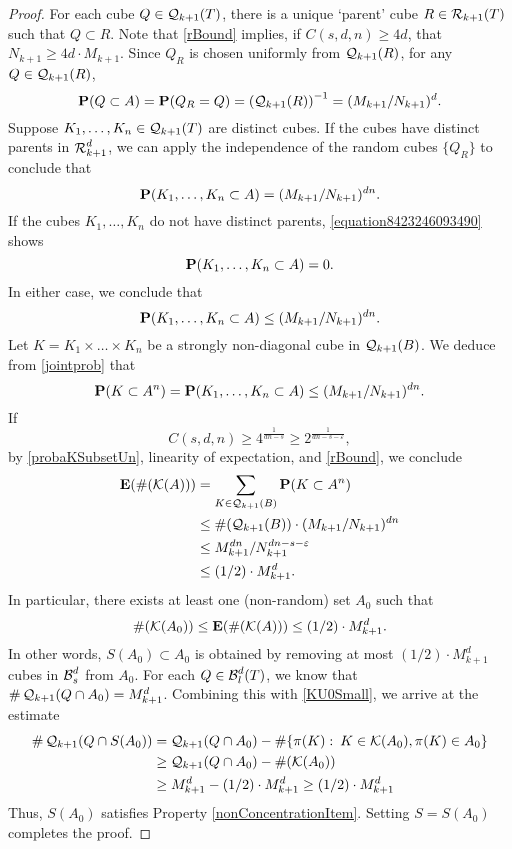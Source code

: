 \begin{proof}
	For each cube $Q \in \operatorname{\mathcal{Q}}_{k+1}(T)$, there is a unique `parent' cube $R \in \operatorname{\mathcal{R}}_{k+1}(T)$ such that $Q \subset R$. Note that \eqref{rBound} implies, if $C(s,d,n) \geq 4d$, that $N_{k+1} \geq 4d \cdot M_{k+1}$. Since $Q_R$ is chosen uniformly from $\operatorname{\mathcal{Q}}_{k+1}(R)$, for any $Q \in \operatorname{\mathcal{Q}}_{k+1}(R)$,
	\[ \operatorname{\operatorname{\mathbf{P}}}(Q \subset A) = \operatorname{\operatorname{\mathbf{P}}}(Q_R = Q) = \left( \operatorname{\mathcal{Q}}_{k+1}(R) \right)^{-1} = (M_{k+1}/N_{k+1})^d. \]
	Suppose $K_1, \dots, K_n \in \operatorname{\mathcal{Q}}_{k+1}(T)$ are distinct cubes. If the cubes have distinct parents in $\operatorname{\mathcal{R}}_{k+1}^d$, we can apply the independence of the random cubes $\{ Q_R \}$ to conclude that
	\[ \operatorname{\operatorname{\mathbf{P}}}(K_1, \dots, K_n \subset A) = (M_{k+1}/N_{k+1})^{dn}. \]
	If the cubes $K_1, \dots, K_n$ do not have distinct parents, \eqref{equation8423246093490} shows
	\[ \operatorname{\operatorname{\mathbf{P}}}(K_1, \dots, K_n \subset A) = 0. \]
	In either case, we conclude that
	\begin{equation}\label{jointprob}
	\operatorname{\operatorname{\mathbf{P}}}(K_1, \dots, K_n \subset A) \leq (M_{k+1}/N_{k+1})^{dn}.
	\end{equation}
	Let $K = K_1 \times \dots \times K_n$ be a strongly non-diagonal cube in $\operatorname{\mathcal{Q}}_{k+1}(B)$. We deduce from \eqref{jointprob} that
	\begin{equation}\label{probaKSubsetUn}
		\operatorname{\operatorname{\mathbf{P}}}(K \subset A^n) = \operatorname{\operatorname{\mathbf{P}}}(K_1, \dots, K_n \subset A) \leq (M_{k+1}/N_{k+1})^{dn}.
	\end{equation}
	If
	\[ C(s,d,n) \geq 4^{\frac{1}{dn - s}} \geq 2^{\frac{1}{dn - s - \varepsilon}}, \]
	by \eqref{probaKSubsetUn}, linearity of expectation, and \eqref{rBound}, we conclude
	\begin{align*}
		\operatorname{\operatorname{\mathbf{E}}}(\#(\mathcal{K}(A))) &= \sum_{K \in \operatorname{\mathcal{Q}}_{k+1}(B)} \operatorname{\operatorname{\mathbf{P}}}(K \subset A^n)\\
		&\leq \#(\operatorname{\mathcal{Q}}_{k+1}(B)) \cdot (M_{k+1}/N_{k+1})^{dn}\\
		&\leq M_{k+1}^{dn} / N_{k+1}^{dn - s - \varepsilon}\\
		&\leq (1/2) \cdot M_{k+1}^d.
	\end{align*}
	In particular, there exists at least one (non-random) set $A_0$ such that
	\begin{equation}\label{KU0Small}
		\#(\mathcal{K}(A_0)) \leq \operatorname{\operatorname{\mathbf{E}}}(\# (\mathcal{K}(A))) \leq (1/2) \cdot M_{k+1}^d.
	\end{equation}
	In other words, $S(A_0) \subset A_0$ is obtained by removing at most $(1/2) \cdot M_{k+1}^d$ cubes in $\operatorname{\mathcal{B}}^d_s$ from $A_0$. For each $Q \in \operatorname{\mathcal{B}}_l^d(T)$, we know that $\# \operatorname{\mathcal{Q}}_{k+1}(Q \cap A_0) = M_{k+1}^d$. Combining this with \eqref{KU0Small}, we arrive at the estimate 
	\begin{align*}
		\# \operatorname{\mathcal{Q}}_{k+1}(Q \cap S(A_0)) &= \operatorname{\mathcal{Q}}_{k+1}(Q \cap A_0) - \# \{ \pi(K) \operatorname{\colon} K \in \mathcal{K}(A_0), \pi(K) \in A_0 \}\\
		&\geq \operatorname{\mathcal{Q}}_{k+1}(Q \cap A_0) - \#(\mathcal{K}(A_0))\\
		&\geq M_{k+1}^d - (1/2) \cdot M_{k+1}^d \geq (1/2) \cdot M_{k+1}^d
	\end{align*}  
	Thus, $S(A_0)$ satisfies Property \ref{nonConcentrationItem}. Setting $S = S(A_0)$ completes the proof.
\end{proof}

